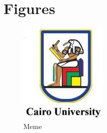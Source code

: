 \documentclass{article}
\begin{document}
    \section{Figures}
    \begin{figure}[t!]
        \includegraphics[width=\linewidth]{slogan.jpg}
        \caption{Meme}
        \label{fig:meme}
    \end{figure}
\end{document}
